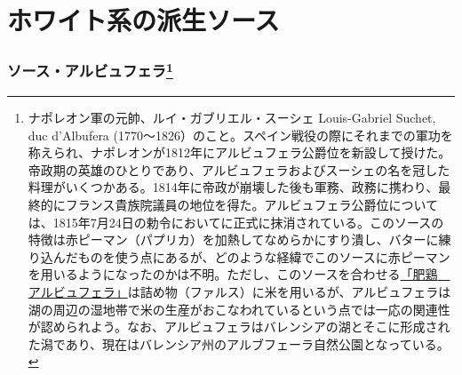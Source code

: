 \href{未、原文対照チェック}{} \href{未、日本語表現校正}{}
\href{未、その他修正}{} \href{未、原稿最終校正}{}

\hypertarget{petites-sauces-blanches}{%
\section{ホワイト系の派生ソース}\label{petites-sauces-blanches}}


\begin{recette}
\hypertarget{sauce-albufera}{%
\subsubsection[ソース・アルビュフェラ]{\texorpdfstring{ソース・アルビュフェラ\footnote{ナポレオン軍の元帥、ルイ・ガブリエル・スーシェ
  Louis-Gabriel Suchet, duc d'Albufera
  (1770〜1826）のこと。スペイン戦役の際にそれまでの軍功を称えられ、ナポレオンが1812年にアルビュフェラ公爵位を新設して授けた。帝政期の英雄のひとりであり、アルビュフェラおよびスーシェの名を冠した料理がいくつかある。1814年に帝政が崩壊した後も軍務、政務に携わり、最終的にフランス貴族院議員の地位を得た。アルビュフェラ公爵位については、1815年7月24日の勅令においてに正式に抹消されている。このソースの特徴は赤ピーマン（パプリカ）を加熱してなめらかにすり潰し、バターに練り込んだものを使う点にあるが、どのような経緯でこのソースに赤ピーマンを用いるようになったのかは不明。ただし、このソースを合わせる\protect\hyperlink{poularde-albufera}{「肥鶏　アルビュフェラ」}は詰め物（ファルス）に米を用いるが、アルビュフェラは湖の周辺の湿地帯で米の生産がおこなわれているという点では一応の関連性が認められよう。なお、アルビュフェラはバレンシアの湖とそこに形成された潟であり、現在はバレンシア州のアルブフェーラ自然公園となっている。}}{ソース・アルビュフェラ}}\label{sauce-albufera}}




\end{recette}
